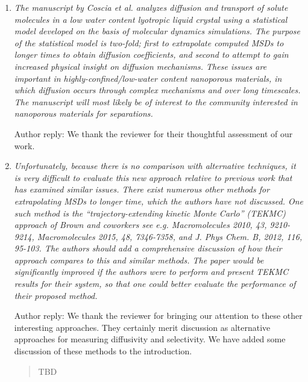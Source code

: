 \documentclass{article}
\begin{document}
\begin{enumerate}[label={Comment \theenumi :}, leftmargin=3.9\parindent]

    \item \textit{The manuscript by Coscia et al. analyzes diffusion and transport of solute molecules
    in a low water content lyotropic liquid crystal using a statistical model developed on the basis 
    of molecular dynamics simulations. The purpose of the statistical model is two-fold; first to 
    extrapolate computed MSDs to longer times to obtain diffusion coefficients, and second to attempt
    to gain increased physical insight on diffusion mechanisms. These issues are important in 
    highly-confined/low-water content nanoporous materials, in which diffusion occurs through complex
    mechanisms and over long timescales. The manuscript will most likely be of interest to the community
    interested in nanoporous materials for separations.}
    
    Author reply: We thank the reviewer for their thoughtful assessment of our work.
    
    \item \textit {Unfortunately, because there is no comparison with alternative techniques, it is 
    very difficult to evaluate this new approach relative to previous work that has examined similar 
    issues. There exist numerous other methods for extrapolating MSDs to longer time, which the 
    authors have not discussed. One such method is the “trajectory-extending kinetic Monte Carlo” 
    (TEKMC) approach of Brown and coworkers see e.g. Macromolecules 2010, 43, 9210-9214, 
    Macromolecules 2015, 48, 7346-7358, and J. Phys Chem. B, 2012, 116, 95-103. The authors should 
    add a comprehensive discussion of how their approach compares to this and similar methods. The 
    paper would be significantly improved if the authors were to perform and present TEKMC results 
    for their system, so that one could better evaluate the performance of their proposed method.}
    
    Author reply: We thank the reviewer for bringing our attention to these other interesting 
    approaches. They certainly merit discussion as alternative approaches for measuring diffusivity
    and selectivity. We have added some discussion of these methods to the introduction.
    
    \begin{quote}
    TBD
    \end{quote} 
    

\end{enumerate}
\end{document}
